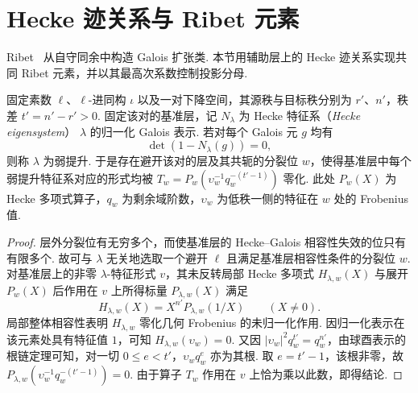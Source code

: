 \section{Hecke 迹关系与 Ribet 元素}
\label{sec:c-ribet}

Ribet~\cite{Ribet1976} 从自守同余中构造 Galois 扩张类. 本节用辅助层上的 Hecke 迹关系实现共同 Ribet 元素，并以其最高次系数控制投影分母.

\begin{lemma}
\label{lem:c-weak-lift-hecke-root}
\emitthmsource
固定素数 $\ell$、$\ell$-进同构 $\iota$ 以及一对下降空间，其源秩与目标秩分别为 $r'$、$n'$，秩差 $t'=n'-r'>0$.
固定该对的基准层，记 $N_\lambda$ 为 Hecke 特征系（\emph{Hecke eigensystem}） $\lambda$ 的归一化 Galois 表示. 若对每个 Galois 元 $g$ 均有
\[
 \det(1-N_\lambda(g))=0 ,
\]
则称 $\lambda$ 为弱提升. 于是存在避开该对的层及其共轭的分裂位 $w$，使得基准层中每个弱提升特征系对应的形式均被 $T_w=P_w(\upsilon_w^{-1}q_w^{-(t'-1)})$ 零化.
此处 $P_w(X)$ 为 Hecke 多项式算子，$q_w$ 为剩余域阶数，$\upsilon_w$ 为低秩一侧的特征在 $w$ 处的 Frobenius 值.
\end{lemma}
\begin{proof}
层外分裂位有无穷多个，而使基准层的 Hecke--Galois 相容性失效的位只有有限多个.
故可与 $\lambda$ 无关地选取一个避开 $\ell$ 且满足基准层相容性条件的分裂位 $w$.
对基准层上的非零 $\lambda$-特征形式 $v$，其未反转局部 Hecke 多项式 $H_{\lambda,w}(X)$ 与展开 $P_w(X)$ 后作用在 $v$ 上所得标量 $P_{\lambda,w}(X)$ 满足
\[
 H_{\lambda,w}(X)=X^{n'}P_{\lambda,w}(1/X)
 \qquad (X\ne0).
\]
局部整体相容性表明 $H_{\lambda,w}$ 零化几何 Frobenius 的未归一化作用.
因归一化表示在该元素处具有特征值 $1$，可知 $H_{\lambda,w}(\upsilon_w)=0$.
又因 $|\upsilon_w|^2 q_w^{t'}=q_w^{n'}$，由球酉表示的根链定理可知，对一切 $0\le e<t'$，$\upsilon_w q_w^e$ 亦为其根.
取 $e=t'-1$，该根非零，故 $P_{\lambda,w}(\upsilon_w^{-1}q_w^{-(t'-1)})=0$.
由于算子 $T_w$ 作用在 $v$ 上恰为乘以此数，即得结论.
\end{proof}

